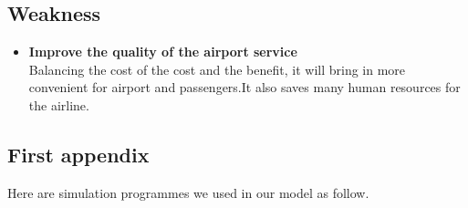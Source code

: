 \documentclass{mcmthesis}
\begin{document}
\subsection{Weakness}
\begin{itemize}
\item \textbf{Improve the quality of the airport service}\\
Balancing the cost of the cost and the benefit, it will bring in
more convenient  for airport and passengers.It also saves many
human resources for the airline. 
\end{itemize}
\newpage
\begin{appendices}
\section{First appendix}
\lipsum[13]
Here are simulation programmes we used in our model as follow.\\
\end{appendices}
\end{document}
